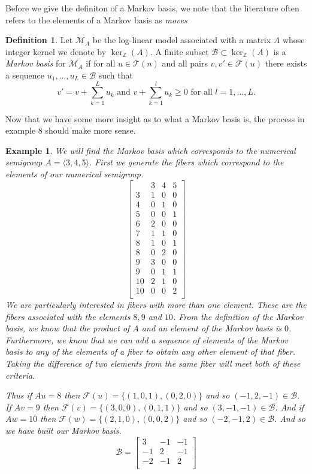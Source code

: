 \documentclass[11pt]{amsart}
\theoremstyle{plain}
\newtheorem{exa}{Example}
\theoremstyle{definition}
\newtheorem{defi}{Definition}
\begin{document}
Before we give the definiton of a Markov basis, we note that the literature often refers to the elements of a Markov basis as \emph{moves}\cite[p.16]{bernd}
\begin{defi}
\cite{bernd}
Let $\mathcal{M}_A$ be the log-linear model associated with a matrix $A$ whose integer kernel we denote by $\ker_\mathbb{Z}(A)$.
A finite subset $\mathcal{B}\subset\ker_{\mathbb{Z}}(A)$ is a \emph{Markov basis} for $\mathcal{M}_A$ if for all $u\in \mathcal{T}(n)$ and all pairs $v,v'\in \mathcal{F}(u)$ there exists a sequence $u_1,\dots,u_L\in  \mathcal{B}$ such that
\[v'=v+\sum\limits_{k=1}^L{u_k}\text{ and }v+\sum\limits_{k=1}^l{u_k}\ge 0\text{ for all }l=1,\dots,L.\]
\end{defi}

Now that we have some more insight as to what a Markov basis is, the process in
example 8 should make more sense.
\begin{exa}
  We will find the Markov basis which corresponds to the numerical semigroup
$A=\langle 3,4,5\rangle$. First we generate the fibers which correspond to the
elements of our numerical semigroup.
\[\left[\begin{array}{r|rrr}
&3&4&5\\
\hline
3&1&0&0\\
4&0&1&0\\
5&0&0&1\\
6&2&0&0\\
7&1&1&0\\
8&1&0&1\\
8&0&2&0\\
9&3&0&0\\
9&0&1&1\\
10&2&1&0\\
10&0&0&2\\
\end{array}\right]
\]
We are particularly interested in fibers with more than one element. These are
the fibers associated with the elements $8,9$ and $10$. From the definition of
the Markov basis, we know that the product of $A$ and an element of the Markov
basis is $0$. Furthermore, we know that we can add a sequence of elements of the
Markov basis to any of the elements of a fiber to obtain any other element of
that fiber. Taking the difference of two elements from the same fiber will
meet both of these criteria.

Thus if $Au=8$ then $\mathcal{F}(u)=\{(1,0,1),(0,2,0)\}$ and so
$(-1,2,-1)\in\mathcal{B}$.
If $Av=9$ then $\mathcal{F}(v)=\{(3,0,0),(0,1,1)\}$ and so
$(3,-1,-1)\in\mathcal{B}$.
And if $Aw=10$ then $\mathcal{F}(w)=\{(2,1,0),(0,0,2)\}$ and so
$(-2,-1,2)\in\mathcal{B}$.
And so we have built our Markov basis.
\[
  \mathcal{B}=\left[\begin{array}{rrr}
  3&-1&-1\\
  -1&2&-1\\
  -2&-1&2\\
  \end{array}\right]
\]
\end{exa}
\end{document}
